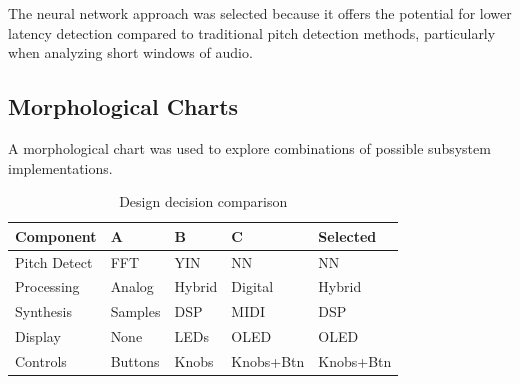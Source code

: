\documentclass[12pt]{article}
\begin{document}
\begin{table}[H]
\centering
{}
\caption{Design decision comparison}
\label{tab:decision}
\end{table}
The neural network approach was selected because it offers the potential for lower latency detection compared to traditional pitch detection methods, particularly when analyzing short windows of audio.


\subsection*{Morphological Charts}
A morphological chart was used to explore combinations of possible subsystem implementations.

\begin{table}[H]
\centering
\begin{tabular}{|l|l|l|l|l|}
\hline
Component & A & B & C & Selected \\ \hline
Pitch Detect & FFT & YIN & NN & NN \\ \hline
Processing & Analog & Hybrid & Digital & Hybrid \\ \hline
Synthesis & Samples & DSP & MIDI & DSP \\ \hline
Display & None & LEDs & OLED & OLED \\ \hline
Controls & Buttons & Knobs & Knobs+Btn & Knobs+Btn \\ \hline
\end{tabular}
\caption{Design decision comparison}
\end{table}
\end{document}
